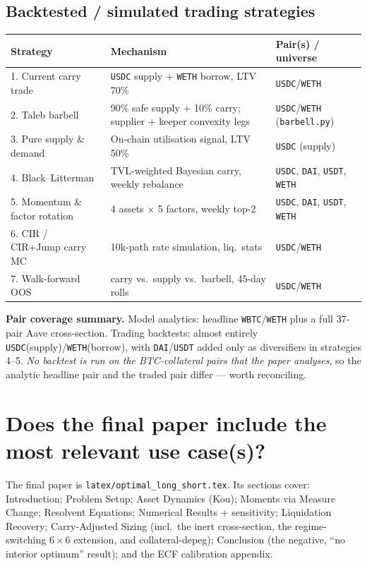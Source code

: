 \documentclass[11pt]{article}
\newcommand{\code}[1]{\texttt{\small #1}}
\begin{document}
\subsection*{Backtested / simulated trading strategies}
\begin{longtable}{p{3.7cm}p{5.0cm}p{4.5cm}}
\toprule
\textbf{Strategy} & \textbf{Mechanism} & \textbf{Pair(s) / universe} \\
\midrule
\endhead
1. Current carry trade & \code{USDC} supply + \code{WETH} borrow, LTV 70\% & \code{USDC}/\code{WETH} \\
2. Taleb barbell & 90\% safe supply + 10\% carry; supplier + keeper convexity legs & \code{USDC}/\code{WETH} (\code{barbell.py}) \\
3. Pure supply \& demand & On-chain utilisation signal, LTV 50\% & \code{USDC} (supply) \\
4. Black--Litterman & TVL-weighted Bayesian carry, weekly rebalance & \code{USDC}, \code{DAI}, \code{USDT}, \code{WETH} \\
5. Momentum \& factor rotation & 4 assets $\times$ 5 factors, weekly top-2 & \code{USDC}, \code{DAI}, \code{USDT}, \code{WETH} \\
6. CIR / CIR+Jump carry MC & 10k-path rate simulation, liq.\ stats & \code{USDC}/\code{WETH} \\
7. Walk-forward OOS & carry vs.\ supply vs.\ barbell, 45-day rolls & \code{USDC}/\code{WETH} \\
\bottomrule
\end{longtable}

\noindent\textbf{Pair coverage summary.} Model analytics: headline
\code{WBTC}/\code{WETH} plus a full 37-pair Aave cross-section. Trading
backtests: almost entirely \code{USDC}(supply)/\code{WETH}(borrow), with
\code{DAI}/\code{USDT} added only as diversifiers in strategies 4--5. \emph{No
backtest is run on the BTC-collateral pairs that the paper analyses}, so the
analytic headline pair and the traded pair differ --- worth reconciling.

\section{Does the final paper include the most relevant use case(s)?}

The final paper is \code{latex/optimal\_long\_short.tex}. Its sections cover:
Introduction; Problem Setup; Asset Dynamics (Kou); Moments via Measure Change;
Resolvent Equations; Numerical Results + sensitivity; Liquidation Recovery;
Carry-Adjusted Sizing (incl.\ the inert cross-section, the regime-switching
$6\times6$ extension, and collateral-depeg); Conclusion (the negative,
``no interior optimum'' result); and the ECF calibration appendix.
\end{document}
